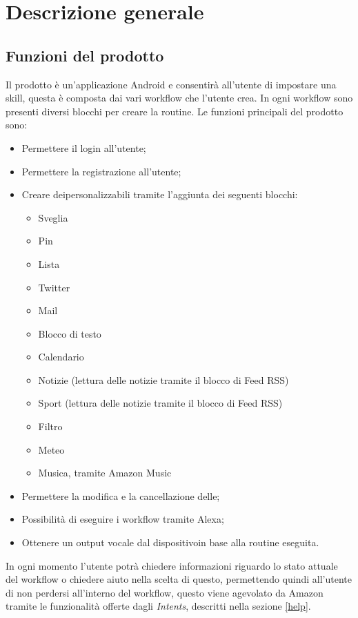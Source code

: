 \chapter{Descrizione generale} \label{DescrizioneGenerale}

\section{Funzioni del prodotto}
Il prodotto è un'applicazione Android e consentirà all'utente di impostare una skill, questa è composta dai vari workflow che l'utente crea. In ogni workflow sono presenti diversi blocchi per creare la routine. Le funzioni principali del prodotto sono:
\begin{itemize}
	\item Permettere il login all'utente;
	\item Permettere la registrazione all'utente;
	\item Creare deipersonalizzabili tramite l'aggiunta dei seguenti blocchi:
	\begin{itemize}
		\item Sveglia
		\item Pin
		\item Lista
		\item Twitter
		\item Mail
		\item Blocco di testo
		\item Calendario
		\item Notizie (lettura delle notizie tramite il blocco di Feed RSS)
		\item Sport (lettura delle notizie tramite il blocco di Feed RSS)
		\item Filtro
		\item Meteo
		\item Musica, tramite Amazon Music 
	\end{itemize}
	\item Permettere la modifica e la cancellazione delle;
	\item Possibilità di eseguire i workflow tramite Alexa;
	\item Ottenere un output vocale dal dispositivoin base alla routine eseguita.
\end{itemize}
In ogni momento l'utente potrà chiedere informazioni riguardo lo stato attuale del workflow o chiedere aiuto nella scelta di questo, permettendo quindi all'utente di non perdersi all'interno del workflow, questo viene agevolato da Amazon tramite le funzionalità offerte dagli \textit{Intents}, descritti nella sezione \ref{help}.

